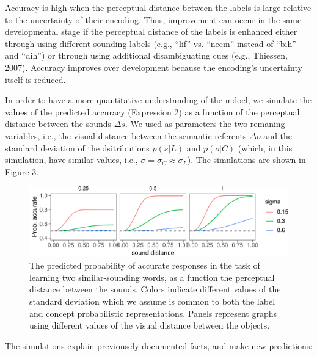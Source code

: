 \documentclass[10pt, letterpaper]{article}
\newenvironment{CodeChunk}{}{}
\begin{document}
Accuracy is high when the perceptual distance between the labels is
large relative to the uncertainty of their encoding. Thus, improvement
can occur in the same developmental stage if the perceptual distance of
the labels is enhanced either through using different-sounding labels
(e.g., ``lif'' vs. ``neem'' instead of ``bih'' and ``dih'') or through
using additional disambiguating cues (e.g., Thiessen, 2007). Accuracy
improves over development because the encoding's uncertainty itself is
reduced.

In order to have a more quantitative understanding of the mdoel, we
simulate the values of the predicted accuracy (Expression 2) as a
function of the perceptual distance between the sounds \(\Delta s\). We
used as parameters the two remaning variables, i.e., the visual distance
between the semantic referents \(\Delta o\) and the standard deviation
of the dsitributions \(p(s| L)\) and \(p(o | C)\) (which, in this
simulation, have similar values, i.e.,
\(\sigma =\sigma_C \approx \sigma_L\)). The simulations are shown in
Figure 3.

\begin{CodeChunk}
\begin{figure}[h]

{\centering \includegraphics{figs/simulation-1} 

}

\caption{\label{fig:simulation}The predicted probability of accurate responses in the task of learning two similar-sounding words, as a function the perceptual distance between the sounds. Colors indicate different values of the standard deviation which we assume is common to both the label and concept probabilistic representations. Panels represent graphs using different values of the visual distance between the objects.}\label{fig:simulation}
\end{figure}
\end{CodeChunk}

The simulations explain previousely documented facts, and make new
predictions:
\end{document}
